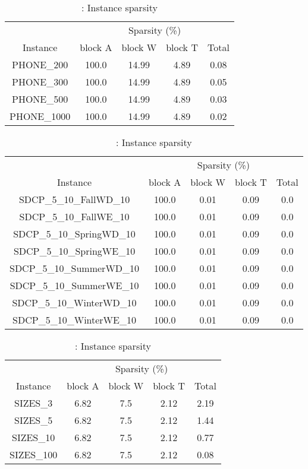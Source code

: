 \begin{table}[H]
\centering
\caption{\phone: Instance sparsity} 
\label{table:instance_sparsity_info_phone} 
\begin{tabular}{|c|cccc|}
\hline 
& \multicolumn{4}{c|}{Sparsity (\%)}  \\ \cline{2-5}
Instance      & block A & block W & block T & Total \\ \hline
PHONE\_200 & 100.0 & 14.99 & 4.89 & 0.08 \\ 
PHONE\_300 & 100.0 & 14.99 & 4.89 & 0.05 \\ 
PHONE\_500 & 100.0 & 14.99 & 4.89 & 0.03 \\ 
PHONE\_1000 & 100.0 & 14.99 & 4.89 & 0.02 \\ 
\hline 
\end{tabular} 
\end{table} 
  

\begin{table}[H]
\centering
\caption{\sdcp: Instance sparsity} 
\label{table:instance_sparsity_info_sdcp} 
\begin{tabular}{|c|cccc|}
\hline 
& \multicolumn{4}{c|}{Sparsity (\%)}  \\ \cline{2-5}
Instance      & block A & block W & block T & Total \\ \hline
SDCP\_5\_10\_FallWD\_10 & 100.0 & 0.01 & 0.09 & 0.0 \\ 
SDCP\_5\_10\_FallWE\_10 & 100.0 & 0.01 & 0.09 & 0.0 \\ 
SDCP\_5\_10\_SpringWD\_10 & 100.0 & 0.01 & 0.09 & 0.0 \\ 
SDCP\_5\_10\_SpringWE\_10 & 100.0 & 0.01 & 0.09 & 0.0 \\ 
SDCP\_5\_10\_SummerWD\_10 & 100.0 & 0.01 & 0.09 & 0.0 \\ 
SDCP\_5\_10\_SummerWE\_10 & 100.0 & 0.01 & 0.09 & 0.0 \\ 
SDCP\_5\_10\_WinterWD\_10 & 100.0 & 0.01 & 0.09 & 0.0 \\ 
SDCP\_5\_10\_WinterWE\_10 & 100.0 & 0.01 & 0.09 & 0.0 \\ 
\hline 
\end{tabular} 
\end{table} 
  

\begin{table}[H]
\centering
\caption{\sizes: Instance sparsity} 
\label{table:instance_sparsity_info_sizes} 
\begin{tabular}{|c|cccc|}
\hline 
& \multicolumn{4}{c|}{Sparsity (\%)}  \\ \cline{2-5}
Instance      & block A & block W & block T & Total \\ \hline
SIZES\_3 & 6.82 & 7.5 & 2.12 & 2.19 \\ 
SIZES\_5 & 6.82 & 7.5 & 2.12 & 1.44 \\ 
SIZES\_10 & 6.82 & 7.5 & 2.12 & 0.77 \\ 
SIZES\_100 & 6.82 & 7.5 & 2.12 & 0.08 \\ 
\hline 
\end{tabular} 
\end{table} 
  

